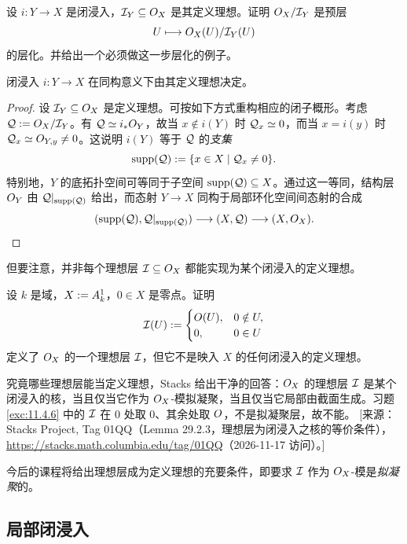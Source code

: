 \begin{exercise}\label{exc:11.4.4}
设 $i \colon Y \to X$ 是闭浸入，$\mathcal{I}_Y \subseteq O_X$ 是其定义理想。证明 $O_X/\mathcal{I}_Y$ 是预层
\[
U \longmapsto O_X(U)/\mathcal{I}_Y(U)
\]
的层化。并给出一个必须做这一步层化的例子。
\end{exercise}

\begin{lemma}\label{lem:11.4.5}
闭浸入 $i \colon Y \to X$ 在同构意义下由其定义理想决定。
\end{lemma}

\begin{proof}
设 $\mathcal{I}_Y \subseteq O_X$ 是定义理想。可按如下方式重构相应的闭子概形。考虑 $\mathcal{Q} := O_X/\mathcal{I}_Y$。有 $\mathcal{Q} \simeq i_*O_Y$，故当 $x \notin i(Y)$ 时 $\mathcal{Q}_x \simeq 0$，而当 $x = i(y)$ 时 $\mathcal{Q}_x \simeq O_{Y,y} \neq 0$。这说明 $i(Y)$ 等于 $\mathcal{Q}$ 的\emph{支集}
\[
\operatorname{supp}(\mathcal{Q}) := \{x \in X \mid \mathcal{Q}_x \neq 0\}.
\]
特别地，$Y$ 的底拓扑空间可等同于子空间 $\operatorname{supp}(\mathcal{Q}) \subseteq X$。通过这一等同，结构层 $O_Y$ 由 $\mathcal{Q}|_{\operatorname{supp}(\mathcal{Q})}$ 给出，而态射 $Y \to X$ 同构于局部环化空间间态射的合成
\[
(\operatorname{supp}(\mathcal{Q}), \mathcal{Q}|_{\operatorname{supp}(\mathcal{Q})}) \longrightarrow (X, \mathcal{Q}) \longrightarrow (X, O_X).
\]
\end{proof}

但要注意，并非每个理想层 $\mathcal{I} \subseteq O_X$ 都能实现为某个闭浸入的定义理想。

\begin{exercise}\label{exc:11.4.6}
设 $k$ 是域，$X := A^1_k$，$0 \in X$ 是零点。证明
\[
\mathcal{I}(U) :=
\begin{cases}
O(U), & 0 \notin U,\\
0, & 0 \in U
\end{cases}
\]
定义了 $O_X$ 的一个理想层 $\mathcal{I}$，但它不是映入 $X$ 的任何闭浸入的定义理想。
\end{exercise}

\begin{yizhu}
究竟哪些理想层能当定义理想，Stacks 给出干净的回答：$O_X$ 的理想层 $\mathcal{I}$ 是某个闭浸入的核，当且仅当它作为 $O_X$-模拟凝聚，当且仅当它局部由截面生成。习题 \ref{exc:11.4.6} 中的 $\mathcal{I}$ 在 $0$ 处取 $0$、其余处取 $O$，不是拟凝聚层，故不能。
[来源：Stacks Project, Tag 01QQ（Lemma 29.2.3，理想层为闭浸入之核的等价条件），\url{https://stacks.math.columbia.edu/tag/01QQ}（2026-11-17 访问）。]
\end{yizhu}

今后的课程将给出理想层成为定义理想的充要条件，即要求 $\mathcal{I}$ 作为 $O_X$-模是\emph{拟凝聚}的。

\subsection{局部闭浸入}\label{sec:11.5}

